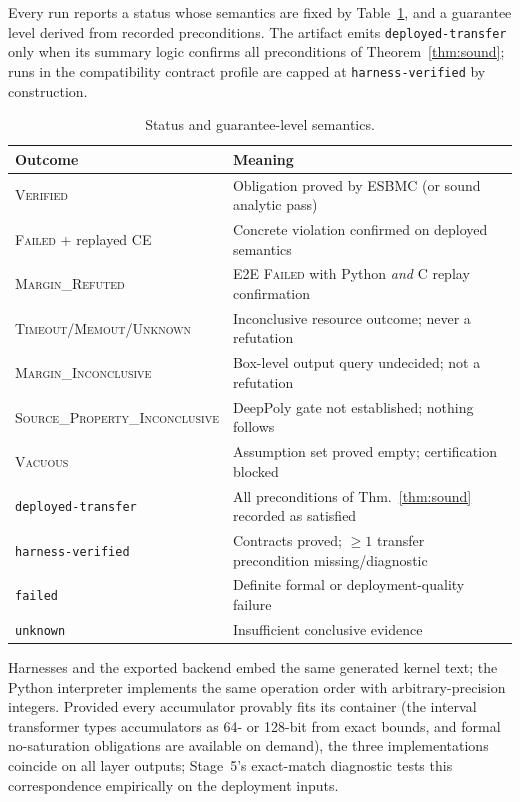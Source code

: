 Every run reports a status whose semantics are fixed by
Table~\ref{tab:status}, and a guarantee level derived from recorded
preconditions. The artifact emits \texttt{deployed-transfer} only when
its summary logic confirms all preconditions of
Theorem~\ref{thm:sound}; runs in the compatibility contract profile are
capped at \texttt{harness-verified} by construction.
 
\begin{table}[t]
\centering\small
\caption{Status and guarantee-level semantics.}
\label{tab:status}
\begin{tabular}{@{}ll@{}}
\toprule
Outcome & Meaning \\
\midrule
\textsc{Verified} & Obligation proved by ESBMC (or sound analytic pass) \\
\textsc{Failed} + replayed CE & Concrete violation confirmed on deployed semantics \\
\textsc{Margin\_Refuted} & E2E \textsc{Failed} with Python \emph{and} C replay confirmation \\
\textsc{Timeout}/\textsc{Memout}/\textsc{Unknown} & Inconclusive resource outcome; never a refutation \\
\textsc{Margin\_Inconclusive} & Box-level output query undecided; not a refutation \\
\textsc{Source\_Property\_Inconclusive} & DeepPoly gate not established; nothing follows \\
\textsc{Vacuous} & Assumption set proved empty; certification blocked \\
\midrule
\texttt{deployed-transfer} & All preconditions of Thm.~\ref{thm:sound} recorded as satisfied \\
\texttt{harness-verified} & Contracts proved; $\ge 1$ transfer precondition missing/diagnostic \\
\texttt{failed} & Definite formal or deployment-quality failure \\
\texttt{unknown} & Insufficient conclusive evidence \\
\bottomrule
\end{tabular}
\end{table}
 
\begin{lemma}
\label{lem:fidelity}
Harnesses and the exported backend embed the same generated kernel
text; the Python interpreter implements the same operation order with
arbitrary-precision integers. Provided every accumulator provably fits
its container (the interval transformer types accumulators as 64- or
128-bit from exact bounds, and formal no-saturation obligations are
available on demand), the three implementations coincide on all layer
outputs; Stage~5's exact-match diagnostic tests this correspondence
empirically on the deployment inputs.
\end{lemma}
 
